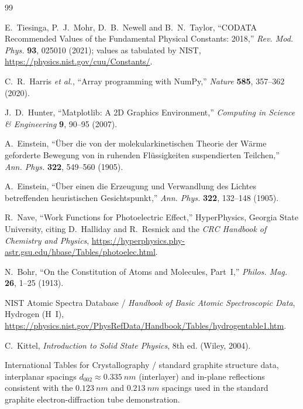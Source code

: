 \documentclass[11pt]{article}
\begin{document}
\begin{thebibliography}{99}

 E.~Tiesinga, P.~J.~Mohr, D.~B.~Newell and B.~N.~Taylor, ``CODATA Recommended Values of the Fundamental Physical Constants: 2018,'' \emph{Rev. Mod. Phys.} \textbf{93}, 025010 (2021); values as tabulated by NIST, \url{https://physics.nist.gov/cuu/Constants/}.

 C.~R.~Harris \emph{et al.}, ``Array programming with NumPy,'' \emph{Nature} \textbf{585}, 357--362 (2020).

 J.~D.~Hunter, ``Matplotlib: A 2D Graphics Environment,'' \emph{Computing in Science \& Engineering} \textbf{9}, 90--95 (2007).

 A.~Einstein, ``\"Uber die von der molekularkinetischen Theorie der W\"arme geforderte Bewegung von in ruhenden Fl\"ussigkeiten suspendierten Teilchen,'' \emph{Ann. Phys.} \textbf{322}, 549--560 (1905).

 A.~Einstein, ``\"Uber einen die Erzeugung und Verwandlung des Lichtes betreffenden heuristischen Gesichtspunkt,'' \emph{Ann. Phys.} \textbf{322}, 132--148 (1905).

 R.~Nave, ``Work Functions for Photoelectric Effect,'' HyperPhysics, Georgia State University, citing D.~Halliday and R.~Resnick and the \emph{CRC Handbook of Chemistry and Physics}, \url{https://hyperphysics.phy-astr.gsu.edu/hbase/Tables/photoelec.html}.

 N.~Bohr, ``On the Constitution of Atoms and Molecules, Part~I,'' \emph{Philos. Mag.} \textbf{26}, 1--25 (1913).

 NIST Atomic Spectra Database / \emph{Handbook of Basic Atomic Spectroscopic Data}, Hydrogen (H~I), \url{https://physics.nist.gov/PhysRefData/Handbook/Tables/hydrogentable1.htm}.

 C.~Kittel, \emph{Introduction to Solid State Physics}, 8th ed. (Wiley, 2004).

 International Tables for Crystallography / standard graphite structure data, interplanar spacings $d_{002}\approx\SI{0.335}{nm}$ (interlayer) and in-plane reflections consistent with the $\SI{0.123}{nm}$ and $\SI{0.213}{nm}$ spacings used in the standard graphite electron-diffraction tube demonstration.


\end{thebibliography}
\end{document}

